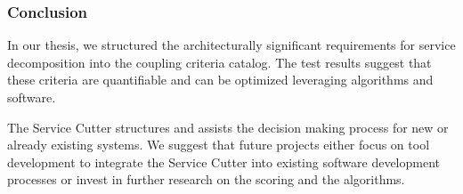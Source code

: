 \subsubsection{Conclusion}
In our thesis, we structured the architecturally significant requirements for service decomposition into the coupling criteria catalog. The test results suggest that these criteria are quantifiable and can be optimized leveraging algorithms and software. 

The Service Cutter structures and assists the decision making process for new or already existing systems. We suggest that future projects either focus on tool development to integrate the Service Cutter into existing software development processes or invest in further research on the  scoring and the algorithms. 
